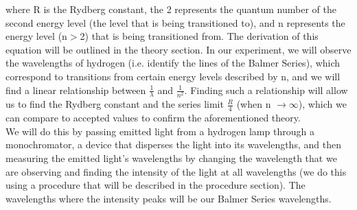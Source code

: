 \documentclass{article}
\begin{document}
        where R is the Rydberg constant, the 2 represents the quantum number of the second energy level (the level that is being transitioned to), and n represents the energy level (n$>$2) that is being transitioned from. The derivation of this equation will be outlined in the theory section. In our experiment, we will observe the wavelengths of hydrogen (i.e. identify the lines of the Balmer Series), which correspond to transitions from certain energy levels described by n, and we will find a linear relationship between $\frac{1}{\lambda}$ and $\frac{1}{n^2}$. Finding such a relationship will allow us to find the Rydberg constant and the series limit $\frac{R}{4}$ (when n $\rightarrow \infty$), which we can compare to accepted values to confirm the aforementioned theory.\\\indent We will do this by passing  emitted light from a hydrogen lamp through a monochromator, a device that disperses the light into its wavelengths, and then measuring the emitted light's wavelengths by changing the wavelength that we are observing and finding the intensity of the light at all wavelengths (we do this using a procedure that will be described in the procedure section). The wavelengths where the intensity peaks will be our Balmer Series wavelengths.
        
\end{document}
